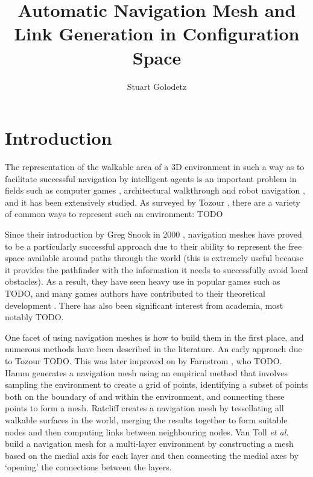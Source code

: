 \documentclass[10pt,onecolumn]{article}
\begin{document}
\title{Automatic Navigation Mesh and Link Generation in Configuration Space}
\author{Stuart Golodetz}
\date{}
\maketitle

\section*{Introduction}

The representation of the walkable area of a 3D environment in such a way as to facilitate successful navigation by intelligent agents is an important problem in fields such as computer games \cite{?}, architectural walkthrough \cite{?} and robot navigation \cite{?}, and it has been extensively studied. As surveyed by Tozour \cite{tozour04}, there are a variety of common ways to represent such an environment: TODO

Since their introduction by Greg Snook in 2000 \cite{snook00}, navigation meshes have proved to be a particularly successful approach due to their ability to represent the free space available around paths through the world (this is extremely useful because it provides the pathfinder with the information it needs to successfully avoid local obstacles). As a result, they have seen heavy use in popular games such as TODO, and many games authors have contributed to their theoretical development \cite{?}. There has also been significant interest from academia, most notably TODO.

One facet of using navigation meshes is how to build them in the first place, and numerous methods have been described in the literature. An early approach due to Tozour \cite{tozour02} TODO. This was later improved on by Farnstrom \cite{farnstrom06}, who TODO. Hamm \cite{hamm08} generates a navigation mesh using an empirical method that involves sampling the environment to create a grid of points, identifying a subset of points both on the boundary of and within the environment, and connecting these points to form a mesh. Ratcliff \cite{ratcliff08} creates a navigation mesh by tessellating all walkable surfaces in the world, merging the results together to form suitable nodes and then computing links between neighbouring nodes. Van Toll \emph{et al.} \cite{vantoll11} build a navigation mesh for a multi-layer environment by constructing a mesh based on the medial axis for each layer and then connecting the medial axes by `opening' the connections between the layers.
\end{document}
